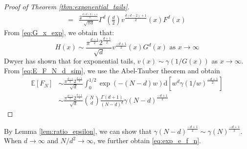 \documentclass[conference,a4paper]{IEEEtran}
\def\E{\mathbb{E}}
\def\dd{\mathrm{d}}
\begin{document}
\begin{proof}[Proof of Theorem \ref{thm:exponential_tails}]
\begin{align*}
    =& \frac{2^{\frac{d(d-2)+1}{2}}}{\sqrt{\pi d}}\Gamma^d\left(\frac{d}{2}\right)
    v^{\frac{d(d-2)+1}{2}}(x)F^d(x)
\end{align*}
From \eqref{eq:G_x_exp}, we obtain that:
\begin{equation}\label{eq:H_x_exp}
     H(x) \sim \frac{\pi^{\frac{d-1}{2}} 2^{\frac{d+1}{2}}}{\sqrt{d}}v^{\frac{-d+1}{2}}(x)G^d(x)
     \textrm{ as } x\to \infty
\end{equation}
Dwyer \cite{dwyer1991convex} has shown that for exponential tails, $v(x) \sim \gamma(1/G(x))$ as $x\to \infty$.
From \eqref{eq:E_F_N_d_sim},
we use the Abel-Tauber theorem
\cite{omey1989abelian} and obtain
\begin{align*}
    \E[F_N] & \sim \frac{\pi^{\frac{d-1}{2}} 2^{\frac{d+1}{2}}}{\sqrt{d}}\int_0^{1/2} \exp(-(N-d)w) \dd [w^d \gamma(1/w)^{\frac{-d+1}{2}}] \\
    &\sim \frac{\pi^{\frac{d-1}{2}} 2^{\frac{d+1}{2}}}{\sqrt{d}} \binom{N}{d}\frac{\Gamma(d+1)}{(N-d)^d} \gamma(N-d)^{\frac{-d+1}{2}}
\end{align*}
\end{proof}


By Lemma \ref{lem:ratio_epsilon}, we can show that
$\gamma(N-d)^{\frac{-d+1}{2}}\sim \gamma(N)^{\frac{-d+1}{2}}$.
When $d\to\infty$ and $N/d^2\to \infty$, we further obtain \eqref{eq:exp_e_f_n}.
 
\end{document}
